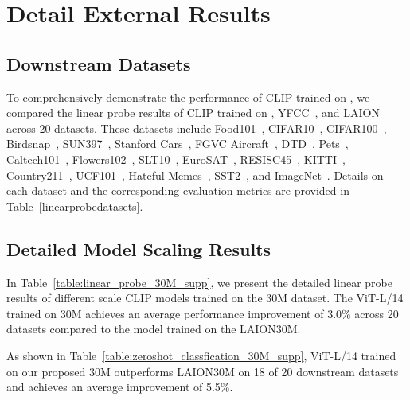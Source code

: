 \section{Detail External Results}
\label{sec: detail external results}









\subsection{Downstream Datasets}

\sloppy
To comprehensively demonstrate the performance of CLIP trained on \dsname, we compared the linear probe results of CLIP trained on \dsname, YFCC~\cite{YFCC100M}, and LAION~\cite{laion400M} across 20 datasets. These datasets
include Food101~\cite{bossard2014food}, 
CIFAR10~\cite{krizhevsky2009learning}, 
CIFAR100~\cite{krizhevsky2009learning}, 
Birdsnap~\cite{berg2014birdsnap},
SUN397~\cite{xiao2010sun},
Stanford Cars~\cite{KrauseStarkDengFei-Fei_3DRR2013},
FGVC Aircraft~\cite{maji2013fine},
DTD~\cite{cimpoi2014describing},
Pets~\cite{parkhi2012cats}, 
Caltech101~\cite{fei2004learning},
Flowers102~\cite{nilsback2008automated},
SLT10~\cite{coates2011analysis},
EuroSAT~\cite{helber2019eurosat},
RESISC45~\cite{cheng2017remote},
KITTI~\cite{geiger2012we},
Country211~\cite{CLIP},
UCF101~\cite{soomro2012ucf101},
Hateful Memes~\cite{kiela2020hateful},
SST2~\cite{CLIP}, and
ImageNet~\cite{ImageNet}. Details on each dataset and the corresponding evaluation metrics are provided in Table~\ref{linearprobedatasets}.

\subsection{Detailed Model Scaling Results}


 In Table~\ref{table:linear_probe_30M_supp}, we present the detailed linear probe results of different scale CLIP models trained on the 30M dataset. The ViT-L/14 trained on \dsname30M achieves an average performance improvement of 3.0\% across 20 datasets compared to the model trained on the LAION30M.

 As shown in Table~\ref{table:zeroshot_classfication_30M_supp}, ViT-L/14 trained on our proposed \dsname30M outperforms LAION30M on 18 of 20 downstream datasets and achieves an average improvement of 5.5\%.

